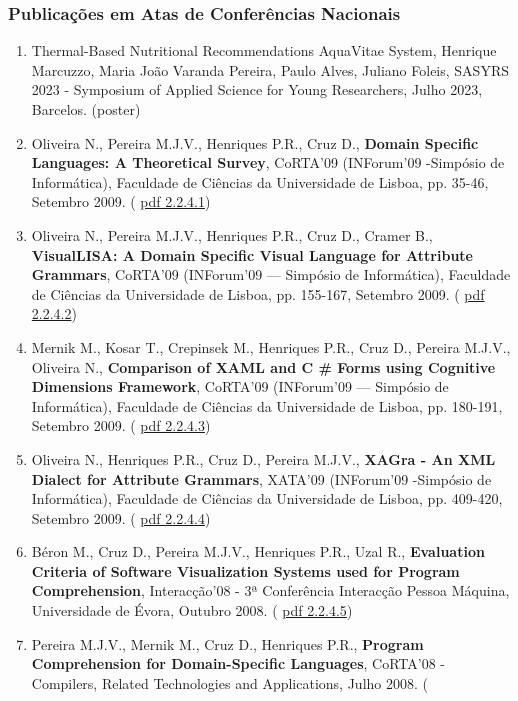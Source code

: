 \documentclass[11pt]{article}
\begin{document}
\subsubsection{Publicações em Atas de Conferências Nacionais}
\begin{enumerate}
\item{Thermal-Based Nutritional Recommendations AquaVitae System, Henrique Marcuzzo, Maria João Varanda Pereira, Paulo Alves, Juliano Foleis, SASYRS 2023 - Symposium of Applied Science for Young Researchers, Julho 2023, Barcelos. (poster)}
\item{Oliveira N., Pereira M.J.V., Henriques P.R., Cruz D., {
\bf{ Domain Specific Languages: A Theoretical Survey}}, CoRTA'09 (INForum'09 -Simpósio de Informática), Faculdade de Ciências da Universidade de Lisboa, pp. 35-46, Setembro 2009. (
\href{run:Publicacoes/publicacoes/45.pdf}{pdf 2.2.4.1})}
\item{Oliveira N., Pereira M.J.V., Henriques P.R., Cruz D., Cramer B., {
\bf{ VisualLISA: A Domain Specific Visual Language for Attribute Grammars}}, CoRTA'09 (INForum'09 --- Simpósio de Informática), Faculdade de Ciências da Universidade de Lisboa, pp. 155-167, Setembro 2009. (
\href{run:Publicacoes/publicacoes/47.pdf}{pdf 2.2.4.2})}
\item{Mernik M., Kosar T., Crepinsek M., Henriques P.R., Cruz D., Pereira M.J.V., Oliveira N., {
\bf{ Comparison of XAML and C
\# Forms using Cognitive Dimensions Framework}}, CoRTA'09 (INForum'09 --- Simpósio de Informática), Faculdade de Ciências da Universidade de Lisboa, pp. 180-191, Setembro 2009. (
\href{run:Publicacoes/publicacoes/41.pdf}{pdf 2.2.4.3})}
\item{Oliveira N., Henriques P.R., Cruz D., Pereira M.J.V., {
\bf{ XAGra - An XML Dialect for Attribute Grammars}}, XATA'09 (INForum'09 -Simpósio de Informática), Faculdade de Ciências da Universidade de Lisboa, pp. 409-420, Setembro 2009. (
\href{run:Publicacoes/publicacoes/46.pdf}{pdf 2.2.4.4})}
\item{Béron M., Cruz D., Pereira M.J.V., Henriques P.R., Uzal R., {
\bf{ Evaluation Criteria of Software Visualization Systems used for Program Comprehension}}, Interacção'08 - 3ª Conferência Interacção Pessoa
\-Máquina, Universidade de Évora, Outubro 2008. (
\href{run:Publicacoes/publicacoes/37.pdf}{pdf 2.2.4.5})}
\item{Pereira M.J.V., Mernik M., Cruz D., Henriques P.R., {
\bf{ Program Comprehension for Domain-Specific Languages}}, CoRTA'08 - Compilers, Related Technologies and Applications, Julho 2008. (
}
\end{enumerate}
\end{document}
